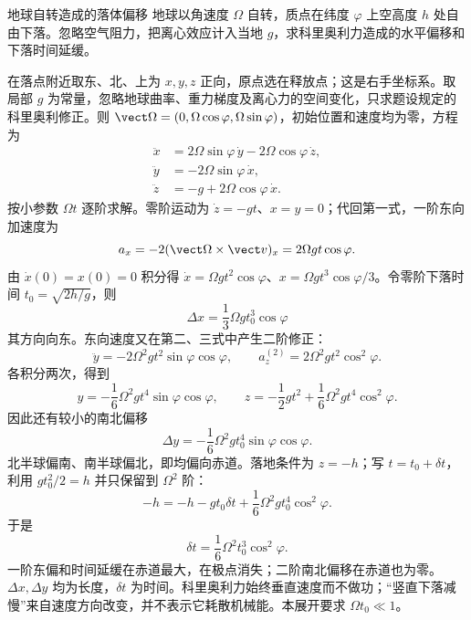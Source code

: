 \begin{practicebox}{地球自转造成的落体偏移}
地球以角速度 $\Omega$ 自转，质点在纬度 $\varphi$ 上空高度 $h$ 处自由下落。忽略空气阻力，把离心效应计入当地 $g$，求科里奥利力造成的水平偏移和下落时间延缓。
\label{r2ch02:pr:004}
\begin{solution}
在落点附近取东、北、上为 $x,y,z$ 正向，原点选在释放点；这是右手坐标系。取局部 $g$ 为常量，忽略地球曲率、重力梯度及离心力的空间变化，只求题设规定的科里奥利修正。则 $\vect\Omega=(0,\Omega\cos\varphi,\Omega\sin\varphi)$，初始位置和速度均为零，方程为
\[
\begin{aligned}
 \ddot x&=2\Omega\sin\varphi\,\dot y-2\Omega\cos\varphi\,\dot z,\\
 \ddot y&=-2\Omega\sin\varphi\,\dot x,\\
 \ddot z&=-g+2\Omega\cos\varphi\,\dot x.
\end{aligned}
\]
按小参数 $\Omega t$ 逐阶求解。零阶运动为 $\dot z=-gt$、$x=y=0$；代回第一式，一阶东向加速度为
\[
 a_x=-2(\vect\Omega\times\vect v)_x=2\Omega g t\cos\varphi.
\]
由 $\dot x(0)=x(0)=0$ 积分得 $\dot x=\Omega gt^2\cos\varphi$、$x=\Omega gt^3\cos\varphi/3$。令零阶下落时间 $t_0=\sqrt{2h/g}$，则
\[
 \boxed{\Delta x=\frac13\Omega g t_0^3\cos\varphi}
\]
其方向向东。东向速度又在第二、三式中产生二阶修正：
\[
 \ddot y=-2\Omega^2gt^2\sin\varphi\cos\varphi,
 \qquad
 a_z^{(2)}=2\Omega^2gt^2\cos^2\varphi.
\]
各积分两次，得到
\[
 y=-\frac16\Omega^2gt^4\sin\varphi\cos\varphi,\qquad
 z=-\frac12gt^2+\frac16\Omega^2g t^4\cos^2\varphi.
\]
因此还有较小的南北偏移
\[
 \boxed{\Delta y=-\frac16\Omega^2g t_0^4\sin\varphi\cos\varphi}.
\]
北半球偏南、南半球偏北，即均偏向赤道。落地条件为 $z=-h$；写 $t=t_0+\delta t$，利用 $gt_0^2/2=h$ 并只保留到 $\Omega^2$ 阶：
\[
 -h=-h-gt_0\delta t+\frac16\Omega^2gt_0^4\cos^2\varphi.
\]
于是
\[
 \boxed{\delta t=\frac16\Omega^2t_0^3\cos^2\varphi}.
\]
一阶东偏和时间延缓在赤道最大，在极点消失；二阶南北偏移在赤道也为零。$\Delta x,\Delta y$ 均为长度，$\delta t$ 为时间。科里奥利力始终垂直速度而不做功；“竖直下落减慢”来自速度方向改变，并不表示它耗散机械能。本展开要求 $\Omega t_0\ll1$。
\end{solution}
\end{practicebox}

